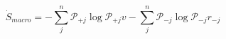\begin{equation}
\dot S_{macro} = -\sum_j^n\mathcal P_{+j}\log\mathcal P_{+j}v -\sum_j^n\mathcal P_{-j}\log\mathcal P_{-j} r_{-j}
\end{equation}